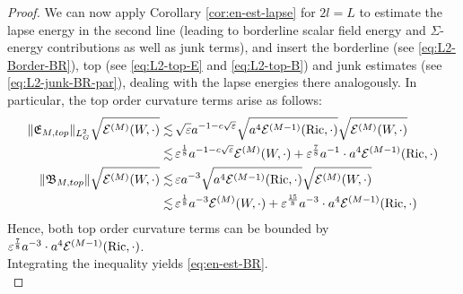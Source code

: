 \documentclass[11pt,leqno,textwidth=10cm]{amsart}
\numberwithin{equation}{section}
\theoremstyle{definition}
\theoremstyle{plain}
\newcommand{\1}{\mathbbm{1}}
\newcommand{\E}{\mathcal{E}}
\newcommand{\Ric}{\text{\normalfont{Ric}}}
\renewcommand{\epsilon}{\varepsilon}
\newcommand{\change}[1]{\color{black}#1\color{black}}
\begin{document}
\begin{proof}
We can now apply Corollary \ref{cor:en-est-lapse} for $2l=L$ to estimate the lapse energy in the second line (leading to borderline scalar field energy and $\Sigma$-energy contributions as well as junk terms), and insert the borderline (see \eqref{eq:L2-Border-BR}), top (see \eqref{eq:L2-top-E} and \eqref{eq:L2-top-B}) and junk estimates (see \eqref{eq:L2-junk-BR-par}), dealing with the lapse energies there analogously. \change{In particular, the top order curvature terms arise as follows:
\begin{align*}
\|\mathfrak{E}_{M,top}\|_{L^2_G}\sqrt{\E^{(M)}(W,\cdot)}\lesssim&\,\sqrt{\epsilon} a^{-1-c\sqrt{\epsilon}}\sqrt{a^4\E^{(M-1)}(\Ric,\cdot)}\sqrt{\E^{(M)}(W,\cdot)}\\
\lesssim&\,\epsilon^\frac18a^{-1-c\sqrt{\epsilon}}\E^{(M)}(W,\cdot)+\epsilon^\frac{7}8a^{-1}\cdot a^4\E^{(M-1)}(\Ric,\cdot)\\
\|\mathfrak{B}_{M,top}\|\sqrt{\E^{(M)}(W,\cdot)}\lesssim&\,\epsilon a^{-3}\sqrt{a^4\E^{(M-1)}(\Ric,\cdot)}\sqrt{\E^{(M)}(W,\cdot)}\\
\lesssim&\,\epsilon^\frac18 a^{-3}\E^{(M)}(W,\cdot)+\epsilon^\frac{15}8 a^{-3}\cdot a^4\E^{(M-1)}(\Ric,\cdot)
\end{align*}
Hence, both top order curvature terms can be bounded by $\epsilon^\frac78a^{-3}\cdot a^4\E^{(M-1)}(\Ric,\cdot)$.\\
Integrating the inequality yields \eqref{eq:en-est-BR}.\\}


\end{proof}
\end{document}
